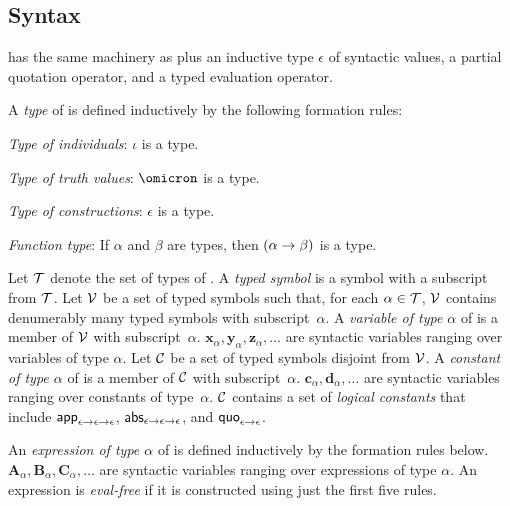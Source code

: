 \documentclass[fleqn]{llncs}
\begin{document}
\subsection{Syntax}

{\churchqe} has the same machinery as {\qzero} plus an
inductive type $\epsilon$ of syntactic values, a partial quotation
operator, and a typed evaluation operator.

A \emph{type} of {\churchqe} is defined inductively by the following
formation rules:
%
\vspace*{-1.5mm}
\be

  \item \emph{Type of individuals}: $\iota$ is a type.

  \item \emph{Type of truth values}: $\omicron$ is a type.

  \item \emph{Type of constructions}: $\epsilon$ is a type.

  \item \emph{Function type}: If $\alpha$ and $\beta$ are types, then
    $(\alpha \rightarrow \beta)$ is a type.

\ee

\noindent
Let $\mbox{$\cal T$}$ denote the set of types of {\churchqe}.  
A \emph{typed symbol} is a symbol with a subscript from $\mbox{$\cal T$}$.  Let
$\mbox{$\cal V$}$ be a set of typed symbols such that, for each $\alpha \in \mbox{$\cal T$}$,
$\mbox{$\cal V$}$ contains denumerably many typed symbols with subscript~$\alpha$.
A \emph{variable of type $\alpha$} of {\churchqe} is a member of $\mbox{$\cal V$}$
with subscript~$\alpha$.  $\textbf{x}_\alpha, \textbf{y}_\alpha,
\textbf{z}_\alpha, \ldots$ are syntactic variables ranging over
variables of type $\alpha$. Let $\mbox{$\cal C$}$ be a set of typed symbols
disjoint from $\mbox{$\cal V$}$.  A \emph{constant of type $\alpha$} of
{\churchqe} is a member of $\mbox{$\cal C$}$ with subscript~$\alpha$.
$\textbf{c}_\alpha, \textbf{d}_\alpha, \ldots$ are syntactic variables
ranging over constants of type~$\alpha$.  $\mbox{$\cal C$}$ contains a set of
\emph{logical constants} that include $\mbox{\sf app}_{\epsilon \rightarrow
  \epsilon \rightarrow \epsilon}$, $\mbox{\sf abs}_{\epsilon \rightarrow \epsilon
  \rightarrow \epsilon}$, and $\mbox{\sf quo}_{\epsilon \rightarrow \epsilon}$.

An \emph{expression of type $\alpha$} of {\churchqe} is defined
inductively by the formation rules below.  $\textbf{A}_\alpha,
\textbf{B}_\alpha, \textbf{C}_\alpha, \ldots$ are syntactic variables
ranging over expressions of type $\alpha$.  An expression is
\emph{eval-free} if it is constructed using just the first five
rules.
%
\vspace*{-3mm}
\be
\end{document}
